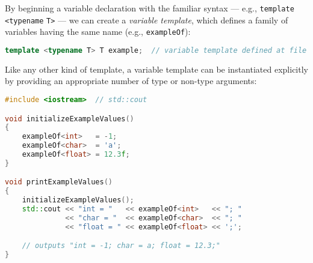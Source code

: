 %
%
%
%

By beginning a variable declaration with the familiar  syntax --- e.g., \lstinline!template! \lstinline!<typename! \lstinline!T>! --- we can create a \emph{variable template}, which defines a family of variables
having the same name (e.g., \lstinline!exampleOf!):

\begin{lstlisting}[language=C++]
template <typename T> T example;  // variable template defined at file scope
\end{lstlisting}

\noindent Like any other kind of template, a variable template can be instantiated explicitly by
providing an appropriate number of type or non-type arguments:

\begin{lstlisting}[language=C++]
#include <iostream>  // std::cout

void initializeExampleValues()
{
    exampleOf<int>   = -1;
    exampleOf<char>  = 'a';
    exampleOf<float> = 12.3f;
}

void printExampleValues()
{
    initializeExampleValues();
    std::cout << "int = "   << exampleOf<int>   << "; "
              << "char = "  << exampleOf<char>  << "; "
              << "float = " << exampleOf<float> << ';';

    // outputs "int = -1; char = a; float = 12.3;"
}
\end{lstlisting}

